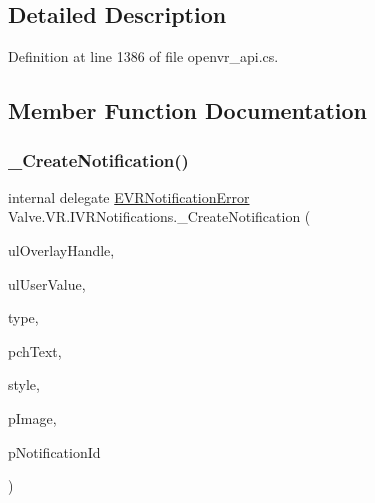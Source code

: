 \subsection{Detailed Description}


Definition at line 1386 of file openvr\+\_\+api.\+cs.



\subsection{Member Function Documentation}
\mbox{\label{struct_valve_1_1_v_r_1_1_i_v_r_notifications_a2e0dd80f177dcb6d1abe8bd96f907867}} 
\subsubsection{\texorpdfstring{\_CreateNotification()}{\_CreateNotification()}}
{\footnotesize\ttfamily internal delegate \mbox{\hyperlink{namespace_valve_1_1_v_r_a9cf788def226e718d9ea88fd55c55646}{E\+V\+R\+Notification\+Error}} Valve.\+V\+R.\+I\+V\+R\+Notifications.\+\_\+\+Create\+Notification (\begin{DoxyParamCaption}\item[{ulong}]{ul\+Overlay\+Handle,  }\item[{ulong}]{ul\+User\+Value,  }\item[{\mbox{\hyperlink{namespace_valve_1_1_v_r_a8401e5b24b0e324a8dd57fe55b00fc65}{E\+V\+R\+Notification\+Type}}}]{type,  }\item[{string}]{pch\+Text,  }\item[{\mbox{\hyperlink{namespace_valve_1_1_v_r_a63b67bb250f81d54e3d3839945bb29da}{E\+V\+R\+Notification\+Style}}}]{style,  }\item[{ref \mbox{\hyperlink{struct_valve_1_1_v_r_1_1_notification_bitmap__t}{Notification\+Bitmap\+\_\+t}}}]{p\+Image,  }\item[{ref uint}]{p\+Notification\+Id }\end{DoxyParamCaption})}

\mbox{\label{struct_valve_1_1_v_r_1_1_i_v_r_notifications_a2778d2957ddd654d347f34e2659da671}} 
